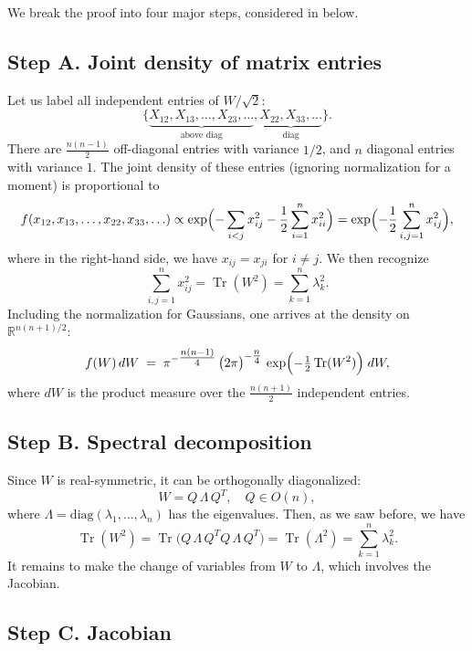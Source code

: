 \documentclass[letterpaper,11pt,oneside,reqno]{article}
\numberwithin{equation}{section}
\theoremstyle{definition}
\begin{document}
We break the proof into four major steps,
considered in
below.

\subsection{Step A. Joint density of matrix entries}
\label{subsec:density-entries}

Let us label all independent entries of \(W/\sqrt 2\):
\[
	\{\underbrace{X_{12}, X_{13},\dots, X_{23},\ldots }_{\text{above diag}},
	\underbrace{X_{22}, X_{33},\dots}_{\text{diag}}\}.
\]
There are \(\frac{n(n-1)}{2}\) off-diagonal entries
with variance $1/2$, 
and \(n\) diagonal entries with variance $1$.
The joint density of these entries (ignoring normalization for a moment) is
proportional to
\begin{equation}
	\label{eq:GOE-density-entries-first}
	f(x_{12},x_{13},\ldots,x_{22},x_{33},\ldots ) 
  \propto\exp\Bigl(
    - \sum_{i<j} x_{ij}^2
    -\frac{1}{2} \sum_{i=1}^n x_{ii}^2
  \Bigr)=
	\exp
	\Bigl( -\frac{1}{2}\sum_{i,j=1}^n x_{ij}^2 \Bigr),
\end{equation}
where in the right-hand side, we have
$x_{ij}=x_{ji}$ for $i\ne j$.
We then recognize 
\[
	\sum_{i,j=1}^n x_{ij}^2=\operatorname{Tr}(W^2)=\sum_{k=1}^n \lambda_k^2.
\]
Including the normalization for Gaussians, one arrives at
the density on $\mathbb{R}^{n(n+1)/2}$:
\[
  f(W)\,dW
  \;=\;
  \pi^{-\tfrac{n(n-1)}{4}}
  \,\bigl(2\pi\bigr)^{-\tfrac{n}{4}}
  \,\exp\Bigl(-\tfrac{1}{2}\operatorname{Tr}(W^2)\Bigr)\; dW,
\]
where \(dW\) is the product measure over the \(\tfrac{n(n+1)}{2}\) independent entries.

\subsection{Step B. Spectral decomposition}
\label{subsec:spectral}

Since \(W\) is real-symmetric, it can be orthogonally diagonalized:
\[
  W = Q\,\Lambda\,Q^T,\quad
  Q \in O(n),
\]
where \(\Lambda = \mathrm{diag}(\lambda_1,\ldots,\lambda_n)\) has the eigenvalues.  Then, as we saw before, we have
\[
  \operatorname{Tr}(W^2)
  = \operatorname{Tr}\bigl(Q\,\Lambda\,Q^T Q\,\Lambda\,Q^T\bigr)
  = \operatorname{Tr}(\Lambda^2)
  = \sum_{k=1}^n \lambda_k^2.
\]
It remains to make the change of variables from \(W\) to \(\Lambda\), which involves the Jacobian.

\subsection{Step C. Jacobian}
\label{subsec:jacobian}
\end{document}
